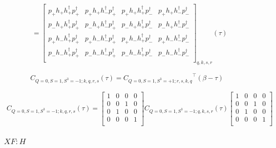 \renewcommand{\cor}[4]{p_{#2}h_{#1}h^\dagger_{#4}p^\dagger_{#3}}

\begin{equation}
  \begin{aligned}
    &=\left[ {\begin{array}{cccc}
      \cor{+}{+}{+}{+} & \cor{+}{+}{+}{-} & \cor{+}{+}{-}{+} & \cor{+}{+}{-}{-} \\
      \cor{+}{-}{+}{+} & \cor{+}{-}{+}{-} & \cor{+}{-}{-}{+} & \cor{+}{-}{-}{-} \\
      \cor{-}{+}{+}{+} & \cor{-}{+}{+}{-} & \cor{-}{+}{-}{+} & \cor{-}{+}{-}{-} \\
      \cor{-}{-}{+}{+} & \cor{-}{-}{+}{-} & \cor{-}{-}{-}{+} & \cor{-}{-}{-}{-} \\
    \end{array} } \right]_{q,k,s,r} (\tau)
  \end{aligned}
\end{equation}

\begin{equation}
  C_{Q=0,S=1,S^3=-1;k,q,r,s} (\tau) = {C_{Q=0,S=1,S^3=+1;r,s,k,q}}^\top (\beta-\tau)
\end{equation}

\begin{equation}
  \begin{aligned}
    C_{Q=0,S=1,S^3=-1;k,q,r,s} (\tau) =
    \left[ {\begin{array}{cccc}
      1 & 0 & 0 & 0 \\
      0 & 0 & 1 & 0 \\
      0 & 1 & 0 & 0 \\
      0 & 0 & 0 & 1 \\
    \end{array} } \right]
    C_{Q=0,S=1,S^3=-1;q,k,s,r}(\tau)
    \left[ {\begin{array}{cccc}
      1 & 0 & 0 & 0 \\
      0 & 0 & 1 & 0 \\
      0 & 1 & 0 & 0 \\
      0 & 0 & 0 & 1 \\
    \end{array} } \right]
  \end{aligned}
\end{equation}

\subsubsection{\underline{$XF : H$}}

